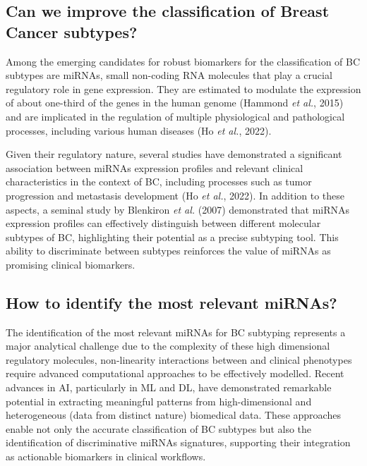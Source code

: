 \subsection{Can we improve the classification of Breast Cancer subtypes?}
Among the emerging candidates for robust biomarkers for the classification of  \gls{BC} subtypes are \gls{miRNAs}, 
small non-coding RNA molecules that play a crucial regulatory role in gene expression. They are estimated to 
modulate the expression of about one-third of the genes in the human genome \cite{mirna_importance_Hammond2015An} 
(Hammond \textit{et al.}, 2015) and are implicated in the regulation of multiple physiological and pathological 
processes, including various human diseases \cite{mirna_as_biomarkers_Ho2022} (Ho \textit{et al.}, 2022).

Given their regulatory nature, several studies have demonstrated a significant association between \gls{miRNAs} expression 
profiles and relevant clinical characteristics in the context of \gls{BC}, including processes such as tumor 
progression and metastasis development \cite{mirna_as_biomarkers_Ho2022} (Ho \textit{et al.}, 2022). In addition to these aspects, a seminal 
study by Blenkiron \textit{et al.} (2007) demonstrated that \gls{miRNAs} expression profiles can effectively distinguish between 
different molecular subtypes of \gls{BC}, highlighting their potential as a precise subtyping tool. This ability to 
discriminate between subtypes reinforces the value of \gls{miRNAs} as promising clinical biomarkers.

\subsection{How to identify the most relevant miRNAs?}

The identification of the most relevant \gls{miRNAs} for \gls{BC} subtyping represents a major analytical challenge due 
to the complexity of these high dimensional regulatory molecules, non-linearity interactions between and 
clinical phenotypes require advanced computational approaches to be effectively modelled. Recent advances in \gls{AI}, 
particularly in \gls{ML} and \gls{DL}, have demonstrated remarkable potential in extracting meaningful patterns from 
high-dimensional and heterogeneous (data from distinct nature) biomedical data. These approaches enable not only the 
accurate classification of \gls{BC} subtypes but also the identification of discriminative \gls{miRNAs} signatures, 
supporting their integration as actionable biomarkers in clinical workflows.

